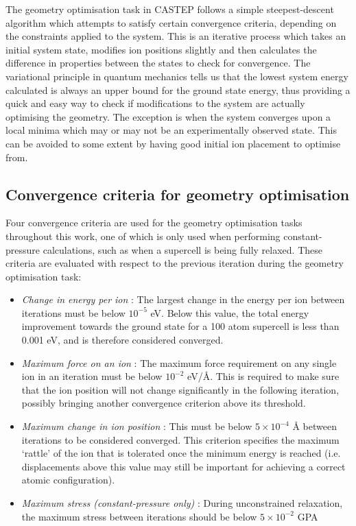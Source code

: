 The geometry optimisation task in CASTEP follows a simple steepest-descent algorithm which attempts to satisfy certain convergence criteria, depending on the constraints applied to the system. This is an iterative process which takes an initial system state, modifies ion positions slightly and then calculates the difference in properties between the states to check for convergence. The variational principle in quantum mechanics tells us that the lowest system energy calculated is always an upper bound for the ground state energy, thus providing a quick and easy way to check if modifications to the system are actually optimising the geometry. The exception is when the system converges upon a local minima which may or may not be an experimentally observed state. This can be avoided to some extent by having good initial ion placement to optimise from.


\subsection{Convergence criteria for geometry optimisation}

Four convergence criteria are used for the geometry optimisation tasks throughout this work, one of which is only used when performing constant-pressure calculations, such as when a supercell is being fully relaxed. These criteria are evaluated with respect to the previous iteration during the geometry optimisation task:

\begin{itemize}
\item \emph{Change in energy per ion} : The largest change in the energy per ion between iterations must be below $10^{-5}$ eV. Below this value, the total energy improvement towards the ground state for a 100 atom supercell is less than 0.001 eV, and is therefore considered converged.
\item \emph{Maximum force on an ion} : The maximum force requirement on any single ion in an iteration must be below $10^{-2}$ eV/\r{A}. This is required to make sure that the ion position will not change significantly in the following iteration, possibly bringing another convergence criterion above its threshold.
\item \emph{Maximum change in ion position} : This must be below $5 \times 10^{-4}$ \r{A} between iterations to be considered converged. This criterion specifies the maximum `rattle' of the ion that is tolerated once the minimum energy is reached (i.e. displacements above this value may still be important for achieving a correct atomic configuration). 
\item \emph{Maximum stress (constant-pressure only)} : During unconstrained relaxation, the maximum stress between iterations should be below $5 \times 10^{-2}$ GPA
\end{itemize}


